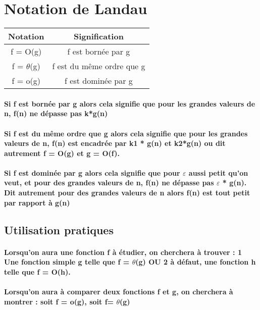 \documentclass{article}
\begin{document}
\section{\textcolor{redhighlight}{Notation de Landau}}
\begin{tabular}{|c|c|}
    \hline
    Notation & Signification \\
    \hline
    f = O(g) & f est bornée par g \\
    \hline
    f =   $\theta$(g) & f est du même ordre que g \\
    \hline
    f = o(g) & f est dominée par g \\

    \hline
\end{tabular}



\paragraph{Si f est bornée par g alors cela signifie que pour les grandes valeurs de n, f(n) ne dépasse pas k*g(n) }
\paragraph{Si f est du même ordre que g alors cela signifie que pour les grandes valeurs de n, f(n) est encadrée par k1 * g(n) et k2*g(n) ou dit autrement f = O(g) et g = O(f). }
\paragraph{Si f est dominée par g alors cela signifie que pour $\varepsilon$ aussi petit qu'on veut, et pour des grandes valeurs de n, f(n) ne dépasse pas $\varepsilon$ * g(n). Dit autrement pour des grandes valeurs de n alors f(n) est tout petit par rapport à g(n) }

\subsection{Utilisation pratiques}
\paragraph{Lorsqu'on aura une fonction f à étudier, on cherchera à trouver : 1 Une fonction simple g telle que  f = $\theta$(g) OU 2 à défaut, une fonction h telle que f = O(h).}
\paragraph{Lorsqu'on aura à comparer deux fonctions f et g, on cherchera à montrer : soit f = o(g), soit f= $\theta$(g)}
\end{document}
